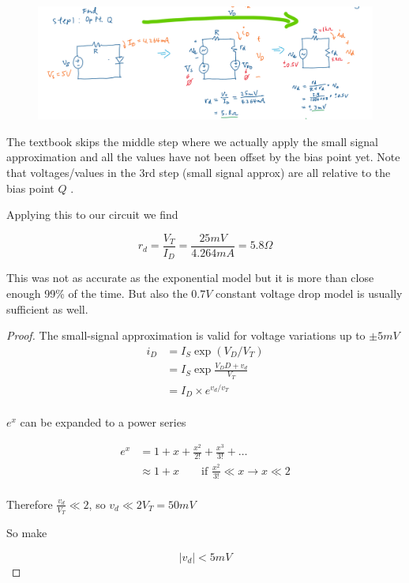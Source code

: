 \documentclass[../notes.tex]{subfiles}
\begin{document}
\begin{figure}[H]
	\centering
	\includegraphics[width=0.8\linewidth]{img/image_2022-09-20-13-41-57.png}
\end{figure}


The textbook skips the middle step where we actually apply the small signal approximation and all the values have not been offset by the bias point yet.
Note that voltages/values in the 3rd step (small signal approx) are all relative to the bias point $ Q $ .





Applying this to our circuit we find

\begin{equation}
	r_d = \frac{V_T}{I_D} = \frac{25mV}{4.264mA} = 5.8 \Omega
\end{equation}

This was not as accurate as the exponential model but it is more than close enough 99\% of the time.
But also the $ 0.7V $ constant voltage drop model is usually sufficient as well.


\begin{proof}

	The small-signal approximation is valid for voltage variations up to $ \pm 5mV $ 
	\begin{equation}
		\begin{split}
			i_D &= I_S \exp (V_D / V_T)  \\
			&= I_S \exp \frac{V_DD + v_d}{V_T}  \\
			&= I_D \times e^{v_d/v_T} \\
		\end{split}
	\end{equation}

	$ e^x  $  can be expanded to a power series

	\begin{equation}
		\begin{split}
			e^x &= 1 + x + \frac{x^2}{2!} + \frac{x^3}{3!} + \ldots \\
			 &\approx 1+x \qquad \text{if } \frac{x^2}{3!} \ll x \rightarrow x \ll 2 \\
		\end{split}
	\end{equation}

	Therefore $ \frac{v_d}{V_T} \ll 2 $, so $ v_d \ll 2V_T = 50mV $ 

	So make 

	\begin{equation}
		|v_d| < 5mV
	\end{equation}
	
	
\end{proof}
\end{document}
